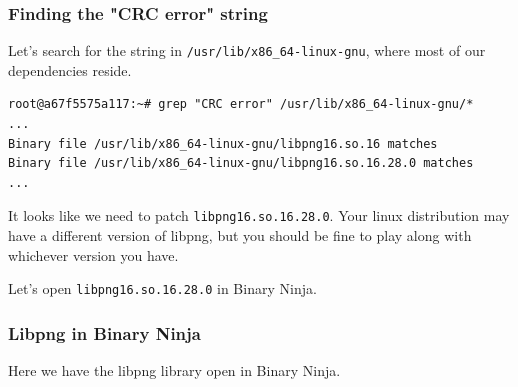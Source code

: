\documentclass{beamer}
\begin{document}
\begin{frame}[fragile]
\frametitle{Finding the "CRC error" string}
Let's search for the string in \texttt{/usr/lib/x86\_64-linux-gnu}, where most
of our dependencies reside.

\begin{lstlisting}
root@a67f5575a117:~# grep "CRC error" /usr/lib/x86_64-linux-gnu/*                       
...
Binary file /usr/lib/x86_64-linux-gnu/libpng16.so.16 matches
Binary file /usr/lib/x86_64-linux-gnu/libpng16.so.16.28.0 matches
...
\end{lstlisting}

It looks like we need to patch \texttt{libpng16.so.16.28.0}. Your linux
distribution may have a different version of libpng, but you should be fine to
play along with whichever version you have.
\par
Let’s open \texttt{libpng16.so.16.28.0} in Binary Ninja.
\end{frame}

\begin{frame}
\frametitle{Libpng in Binary Ninja}
  \small{Here we have the libpng library open in Binary Ninja.}
\end{frame}

\end{document}
